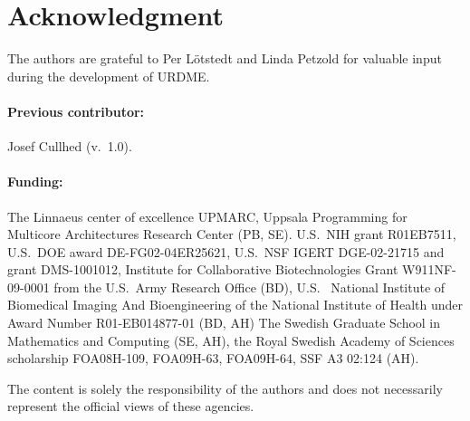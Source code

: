 \section*{Acknowledgment}

The authors are grateful to Per L{\"o}tstedt and Linda Petzold for
valuable input during the development of URDME.

\paragraph{Previous contributor:} Josef Cullhed (v.~1.0).

\paragraph{Funding:} 

The Linnaeus center of excellence UPMARC, Uppsala Programming for
Multicore Architectures Research Center (PB, SE). U.S.~NIH grant
R01EB7511, U.S.~DOE award DE-FG02-04ER25621, U.S.~NSF IGERT
DGE-02-21715 and grant DMS-1001012, Institute for Collaborative Biotechnologies Grant
W911NF-09-0001 from the U.S.~Army Research Office (BD), U.S.~ National Institute of Biomedical Imaging And Bioengineering of the National Institute of Health under Award Number R01-EB014877-01 (BD, AH) The Swedish Graduate School in Mathematics and Computing (SE, AH), the Royal Swedish Academy of Sciences scholarship
FOA08H-109, FOA09H-63, FOA09H-64, SSF A3 02:124 (AH).

The content is solely the responsibility of the authors and does not necessarily
represent the official views of these agencies.  %


